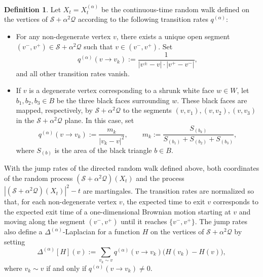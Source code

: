 \documentclass[reqno]{amsart}
\numberwithin{equation}{section}
\theoremstyle{definition}
\newtheorem{definition}[theo]{Definition}
\theoremstyle{remark}
\newcommand\cQ{\mathcal{Q}}
\newcommand\cS{\mathcal{S}}
\begin{document}
\begin{definition}\label{def:RW-S-graph}
Let $X_t = X_t^{(\alpha)}$ be the continuous-time random walk defined on the vertices of $\cS + \alpha^2 \cQ$ according to the following transition rates $q^{(\alpha)}$:
\smallskip
\begin{itemize}
    \item For any non-degenerate vertex $v$, there exists a unique open segment $(v^-, v^+) \in \cS + \alpha^2 \cQ$ such that $v \in (v^-, v^+)$. Set
    \begin{equation}\label{eq:jump-rates-non-degenerate}
        q^{(\alpha)}(v \to v_k) := \frac{1}{|v^\pm - v| \cdot |v^+ - v^-|},
    \end{equation}
    and all other transition rates vanish.

    \item If $v$ is a degenerate vertex corresponding to a shrunk white face $w \in W$, let $b_1, b_2, b_3 \in B$ be the three black faces surrounding $w$. These black faces are mapped, respectively, by $\cS + \alpha^2 \cQ$ to the segments $(v, v_1), (v, v_2), (v, v_3)$ in the $\cS + \alpha^2 \cQ$ plane. In this case, set
    \begin{equation}\label{eq:jump-rates-degenerate}
        q^{(\alpha)}(v \to v_k) := \frac{m_k}{|v_k - v|^2}, \qquad
        m_k := \frac{S_{(b_k)}}{S_{(b_1)} + S_{(b_2)} + S_{(b_3)}},
    \end{equation}
    where $S_{(b)}$ is the area of the black triangle $b \in B$.
\end{itemize}
\end{definition}

With the jump rates of the directed random walk defined above, both coordinates of the random process $(\cS + \alpha^2 \cQ)(X_t)$ and the process $|(\cS + \alpha^2 \cQ)(X_t)|^2 - t$ are martingales. The transition rates are normalized so that, for each non-degenerate vertex $v$, the expected time to exit $v$ corresponds to the expected exit time of a one-dimensional Brownian motion starting at $v$ and moving along the segment $(v^-, v^+)$ until it reaches $\{v^-, v^+\}$. The jump rates also define a $\Delta^{(\alpha)}$-Laplacian for a function $H$ on the vertices of $\cS + \alpha^2 \cQ$ by setting
\begin{equation}
    \Delta^{(\alpha)}[H](v) := \sum\limits_{v_k \sim v} q^{(\alpha)}(v \to v_k) \big( H(v_k) - H(v) \big),
\end{equation}
where $v_k \sim v$ if and only if $q^{(\alpha)}(v \to v_k) \neq 0$.
\end{document}
